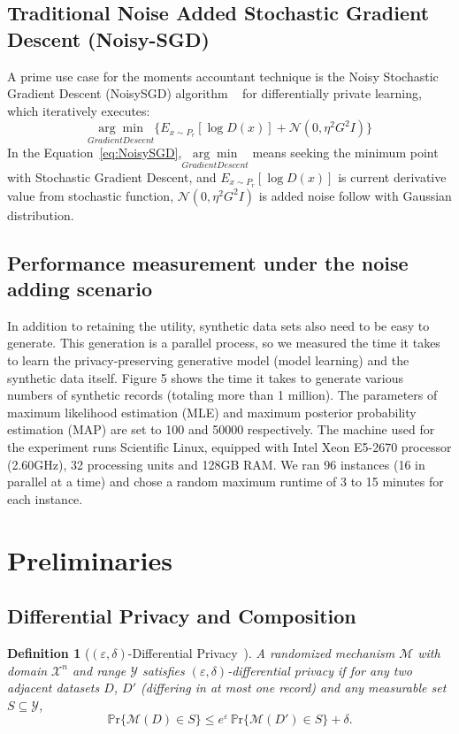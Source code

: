 \documentclass[journal,transmag]{IEEEtran}
\newtheorem{definition}{Definition}
\begin{document}
\subsection{Traditional Noise Added Stochastic Gradient Descent (Noisy-SGD)}
A prime use case for the moments accountant technique is the Noisy Stochastic Gradient Descent (NoisySGD) algorithm \cite{song2013stochastic}~\cite{bassily2014private} for differentially private learning, which iteratively executes:
\begin{equation}\label{eq:NoisySGD}
 \underset{Gradient Descent}{\arg\min} \lbrace E_{x\sim P_r} [\log D(x)]+\mathcal{N}(0,\eta^2 G^2 I) \rbrace
\end{equation}
In the Equation~\ref{eq:NoisySGD},$\underset{Gradient Descent}{\arg\min}$ means seeking the minimum point with Stochastic Gradient Descent, and $E_{x\sim P_r} [\log D(x)]$ is current derivative value from stochastic function, $\mathcal{N}(0,\eta^2 G^2 I)$ is added noise follow with Gaussian distribution. 




\subsection{Performance measurement under the noise adding scenario}

In addition to retaining the utility, synthetic data sets also need to be easy to generate. This generation is a parallel process, so we measured the time it takes to learn the privacy-preserving generative model (model learning) and the synthetic data itself. Figure 5 shows the time it takes to generate various numbers of synthetic records (totaling more than 1 million). The parameters of maximum likelihood estimation (MLE) and maximum posterior probability estimation (MAP) are set to 100 and 50000 respectively. The machine used for the experiment runs Scientific Linux, equipped with Intel Xeon E5-2670 processor (2.60GHz), 32 processing units and 128GB RAM. We ran 96 instances (16 in parallel at a time) and chose a random maximum runtime of 3 to 15 minutes for each instance.


\section{Preliminaries}
\subsection{Differential Privacy and Composition}
\begin{definition}[$(\varepsilon,\delta)$-Differential Privacy~\cite{dwork2006differential}]
A randomized mechanism $\mathcal{M}$ with domain $\mathcal{X}^n$ and range $\mathcal{Y}$ satisfies $(\varepsilon,\delta)$-differential privacy if for any two adjacent datasets $D$, $D'$ (differing in at most one record) and any measurable set $S \subseteq \mathcal{Y}$,
\begin{equation}
\mathbb{P}\mathrm{r}\{\mathcal{M}(D) \in S\} \leq e^{\varepsilon}\,\mathbb{P}\mathrm{r}\{\mathcal{M}(D') \in S\} + \delta.
\end{equation}
\end{definition}
\end{document}
